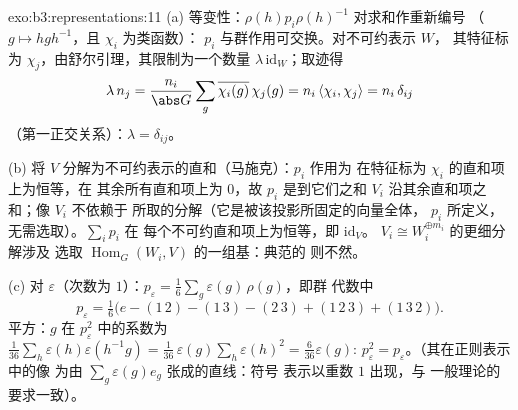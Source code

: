 \begin{solution}{exo:b3:representations:11}
(a) 等变性：$\rho(h)p_i\rho(h)^{-1}$ 对求和作重新编号
（$g \mapsto hgh^{-1}$，且 $\chi_i$ 为类函数）：
$p_i$ 与群作用可交换。对不可约表示 $W$，
其特征标为 $\chi_j$，由舒尔引理，其限制为一个数量
$\lambda\,\mathrm{id}_W$；取迹得
\[
\lambda\,n_j = \frac{n_i}{\abs G}\sum_g
\overline{\chi_i(g)}\,\chi_j(g) = n_i\,\langle\chi_i,
\chi_j\rangle = n_i\,\delta_{ij}
\]
（第一正交关系）：$\lambda = \delta_{ij}$。

(b) 将 $V$ 分解为不可约表示的直和（马施克）：$p_i$ 作用为
在特征标为 $\chi_i$ 的直和项上为恒等，在
其余所有直和项上为 $0$，故 $p_i$ 是到它们之和 $V_i$
沿其余直和项之和；像 $V_i$ 不依赖于
所取的分解（它是被该投影所固定的向量全体，
$p_i$ 所定义，无需选取）。$\sum_ip_i$ 在
每个不可约直和项上为恒等，即 $\mathrm{id}_V$。
$V_i \cong W_i^{\oplus m_i}$ 的更细分解涉及
选取 $\operatorname{Hom}_G(W_i, V)$ 的一组基：典范的
则不然。

(c) 对 $\varepsilon$（次数为 $1$）：$p_\varepsilon =
\frac1{6}\sum_{g}\varepsilon(g)\,\rho(g)$，即群
代数中
\[
p_\varepsilon = \tfrac16\bigl(e - (1\,2) - (1\,3) - (2\,3)
+ (1\,2\,3) + (1\,3\,2)\bigr) .
\]
平方：$g$ 在 $p_\varepsilon^2$ 中的系数为
$\frac1{36}\sum_{h}\varepsilon(h)\varepsilon(h^{-1}g) =
\frac1{36}\,\varepsilon(g)\sum_h\varepsilon(h)^2 =
\frac{6}{36}\varepsilon(g)$: $p_\varepsilon^2 =
p_\varepsilon$。（其在正则表示中的像
为由 $\sum_g\varepsilon(g)e_g$ 张成的直线：符号
表示以重数 $1$ 出现，与
一般理论的要求一致）。
\end{solution}

